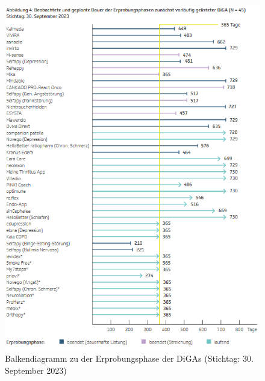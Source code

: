 \documentclass{article}
\begin{document}
			\begin{figure}[htbp]
				\centering
				\includegraphics[height=0.5\textheight]{./grafiken/erprobungs_phase_diga}
				\centering
				\caption[Erprobungsphase von den DiGAs]{Balkendiagramm zu der Erprobungsphase der DiGAs (Stichtag: 30. September 2023)}
				\label{Abb-erprobungsphase-diga}
			\end{figure}
\end{document}
